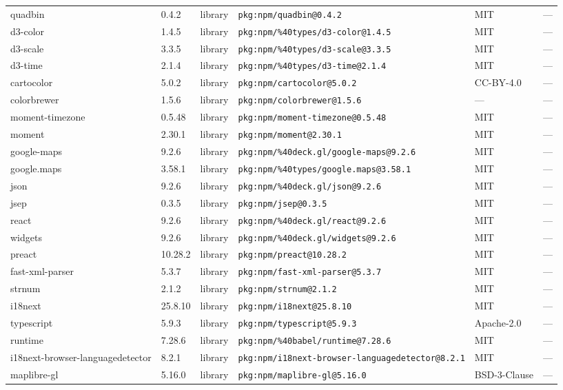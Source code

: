 \documentclass[11pt]{article}
\begin{document}
\begin{longtable}{|l|l|l|p{2.2cm}|l|p{4cm}|}
quadbin & 0.4.2 & library & \texttt{pkg:npm/quadbin@0.4.2} & MIT & — \\
d3-color & 1.4.5 & library & \texttt{pkg:npm/\%40types/d3-color@1.4.5} & MIT & — \\
d3-scale & 3.3.5 & library & \texttt{pkg:npm/\%40types/d3-scale@3.3.5} & MIT & — \\
d3-time & 2.1.4 & library & \texttt{pkg:npm/\%40types/d3-time@2.1.4} & MIT & — \\
cartocolor & 5.0.2 & library & \texttt{pkg:npm/cartocolor@5.0.2} & CC-BY-4.0 & — \\
colorbrewer & 1.5.6 & library & \texttt{pkg:npm/colorbrewer@1.5.6} & — & — \\
moment-timezone & 0.5.48 & library & \texttt{pkg:npm/moment-timezone@0.5.48} & MIT & — \\
moment & 2.30.1 & library & \texttt{pkg:npm/moment@2.30.1} & MIT & — \\
google-maps & 9.2.6 & library & \texttt{pkg:npm/\%40deck.gl/google-maps@9.2.6} & MIT & — \\
google.maps & 3.58.1 & library & \texttt{pkg:npm/\%40types/google.maps@3.58.1} & MIT & — \\
json & 9.2.6 & library & \texttt{pkg:npm/\%40deck.gl/json@9.2.6} & MIT & — \\
jsep & 0.3.5 & library & \texttt{pkg:npm/jsep@0.3.5} & MIT & — \\
react & 9.2.6 & library & \texttt{pkg:npm/\%40deck.gl/react@9.2.6} & MIT & — \\
widgets & 9.2.6 & library & \texttt{pkg:npm/\%40deck.gl/widgets@9.2.6} & MIT & — \\
preact & 10.28.2 & library & \texttt{pkg:npm/preact@10.28.2} & MIT & — \\
fast-xml-parser & 5.3.7 & library & \texttt{pkg:npm/fast-xml-parser@5.3.7} & MIT & — \\
strnum & 2.1.2 & library & \texttt{pkg:npm/strnum@2.1.2} & MIT & — \\
i18next & 25.8.10 & library & \texttt{pkg:npm/i18next@25.8.10} & MIT & — \\
typescript & 5.9.3 & library & \texttt{pkg:npm/typescript@5.9.3} & Apache-2.0 & — \\
runtime & 7.28.6 & library & \texttt{pkg:npm/\%40babel/runtime@7.28.6} & MIT & — \\
i18next-browser-languagedetector & 8.2.1 & library & \texttt{pkg:npm/i18next-browser-languagedetector@8.2.1} & MIT & — \\
maplibre-gl & 5.16.0 & library & \texttt{pkg:npm/maplibre-gl@5.16.0} & BSD-3-Clause & — \\

\end{longtable}
\end{document}
